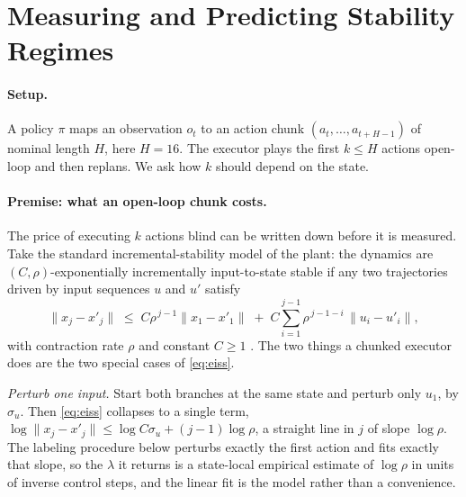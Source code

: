 \section{Measuring and Predicting Stability Regimes}
\label{sec:method}

\paragraph{Setup.}
A policy $\pi$ maps an observation $o_t$ to an action chunk
$(a_t, \dots, a_{t+H-1})$ of nominal length $H$, here $H{=}16$. The executor
plays the first $k \le H$ actions open-loop and then replans. We ask how $k$
should depend on the state.

\paragraph{Premise: what an open-loop chunk costs.}
The price of executing $k$ actions blind can be written down before it is
measured. Take the standard incremental-stability model of the plant: the
dynamics are $(C,\rho)$-exponentially incrementally input-to-state stable if any
two trajectories driven by input sequences $u$ and $u'$ satisfy
\begin{equation}
\lVert x_j - x'_j \rVert \;\le\; C\rho^{\,j-1}\lVert x_1 - x'_1 \rVert
\;+\; C\sum_{i=1}^{j-1} \rho^{\,j-1-i}\,\lVert u_i - u'_i \rVert ,
\label{eq:eiss}
\end{equation}
with contraction rate $\rho$ and constant $C \ge 1$
\citep{simchowitz2025pitfalls,zhang2025chunking}. The two things a chunked
executor does are the two special cases of \eqref{eq:eiss}.

\emph{Perturb one input.} Start both branches at the same state and perturb only
$u_1$, by $\sigma_u$. Then \eqref{eq:eiss} collapses to a single term,
$\log \lVert x_j - x'_j \rVert \le \log C\sigma_u + (j-1)\log\rho$, a straight
line in $j$ of slope $\log\rho$. The labeling procedure below perturbs exactly
the first action and fits exactly that slope, so the $\lambda$ it returns is a
state-local empirical estimate of $\log\rho$ in units of inverse control steps,
and the linear fit is the model rather than a convenience.

